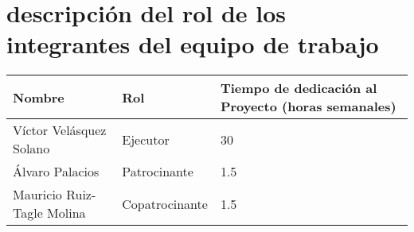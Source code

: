 \section{descripción del rol de los integrantes del equipo de trabajo}
\begin{table}[h]
  \centering
  \begin{tabular}{|p{5cm}|p{5cm}|p{4cm}|}
  \hline
  \rowcolor{tableheadcolor} \textbf{Nombre} & \textbf{Rol} &
  \textbf{Tiempo de dedicación al Proyecto (horas semanales)} \\
  \hline
  Víctor Velásquez Solano & Ejecutor & 30 \\
  \hline
  Álvaro Palacios & Patrocinante & 1.5 \\
  \hline
  Mauricio Ruiz-Tagle Molina & Copatrocinante
  & 1.5 \\
  \hline
  \end{tabular}
\end{table}


